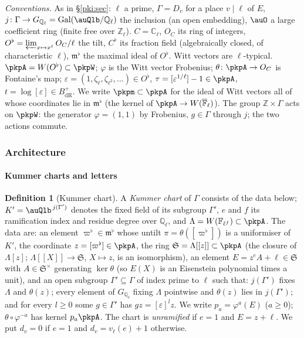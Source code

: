 \documentclass[10pt]{amsart}
\theoremstyle{definition}
\newtheorem{definition}[theorem]{Definition}
\theoremstyle{remark}
\newcommand{\C}{\mathbb C}
\newcommand{\Z}{\mathbb Z}
\newcommand{\Q}{\mathbb Q}
\begin{document}
\emph{Conventions.} As in \S\ref{pki:sec}: $\ell$ a prime, $\Gamma=D_v$ for a place $v\mid\ell$ of
$E$, $j\colon\Gamma\to G_{\Q_\ell}=\operatorname{Gal}(\auQlb/\Q_\ell)$ the inclusion (an open
embedding), $\auO$ a large coefficient ring (finite free over $\Z_\ell$). $C=\C_\ell$, $O_C$ its
ring of integers, $O^\flat=\varprojlim_{x\mapsto x^\ell}O_C/\ell$ the tilt, $C^\flat$ its fraction
field (algebraically closed, of characteristic $\ell$), $\mathfrak m^\flat$ the maximal ideal of
$O^\flat$. Witt vectors are $\ell$-typical. $\pkpA=W(O^\flat)\subset\pkpW$; $\varphi$ is the Witt
vector Frobenius; $\theta\colon\pkpA\to O_C$ is Fontaine's map; $\varepsilon=(1,\zeta_\ell,
\zeta_{\ell^2},\dots)\in O^\flat$, $\tau=[\varepsilon^{1/\ell}]-1\in\pkpA$, $t=\log[\varepsilon]\in
B_{\mathrm{dR}}^+$. We write $\pkpm\subset\pkpA$ for the ideal of Witt vectors all of whose
coordinates lie in $\mathfrak m^\flat$ (the kernel of $\pkpA\to W(\overline{\mathbb F}_\ell)$). The
group $\Z\times\Gamma$ acts on $\pkpW$: the generator $\varphi=(1,1)$ by Frobenius, $g\in\Gamma$
through $j$; the two actions commute.

\subsubsection{Architecture}\label{pkp:ss-arch}

\paragraph*{Kummer charts and letters}

\begin{definition}[Kummer chart]\label{pkp:def-chart}
A \emph{Kummer chart} of $\Gamma$ consists of the data below; $K'=\auQlb^{\,j(\Gamma')}$ denotes the
fixed field of its subgroup $\Gamma'$, $e$ and $f$ its ramification index and residue degree over
$\Q_\ell$, and $\Lambda=W(\mathbb F_{\ell^f})\subset\pkpA$. The data are: an
element $\varpi^\flat\in\mathfrak m^\flat$ whose untilt $\pi=\theta([\varpi^\flat])$ is a uniformiser of
$K'$, the coordinate $z=[\varpi^\flat]\in\pkpA$, the ring $\mathfrak S=\Lambda[[z]]\subset\pkpA$ (the
closure of $\Lambda[z]$; $\Lambda[[X]]\to\mathfrak S$, $X\mapsto z$, is an isomorphism), an element
$E=z^eA+\ell\in\mathfrak S$ with $A\in\mathfrak S^\times$ generating $\ker\theta$ (so
$E(X)$ is an Eisenstein polynomial times a unit), and an open subgroup $\Gamma'\subseteq\Gamma$ of index prime to $\ell$
such that: $j(\Gamma')$ fixes $\Lambda$ and $\theta(z)$; every element of $G_{\Q_\ell}$ fixing $\Lambda$
pointwise and $\theta(z)$ lies in $j(\Gamma')$; and for every $l\ge0$ some $g\in\Gamma'$ has
$gz=[\varepsilon]^lz$. We write $p_a=\varphi^a(E)$ ($a\ge0$); $\theta\circ\varphi^{-a}$ has kernel
$p_a\pkpA$. The chart is \emph{unramified} if $e=1$ and $E=z+\ell$. We put $d_v=0$ if $e=1$ and
$d_v=v_\ell(e)+1$ otherwise.
\end{definition}
\end{document}
